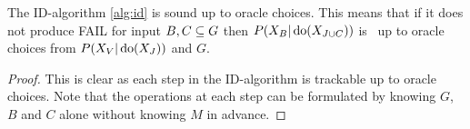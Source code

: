 \begin{Cor}  
    \label{cor:id-alg-sound-oracle}
    The ID-algorithm \ref{alg:id} is sound up to oracle choices.
    This means that if it does not produce FAIL for input $B, C \subseteq G$ 
    then $P(X_B|\operatorname{do}(X_{J \cup C}))$ is \trackable\ up to oracle choices from $P(X_V|\operatorname{do}(X_J))$ and $G$.
    \begin{proof}
    This is clear as each step in the ID-algorithm is trackable up to oracle choices.
    Note that the operations at each step can be formulated by knowing $G$, $B$ and $C$ alone 
    without knowing $M$ in advance.

    \end{proof}
\end{Cor}


